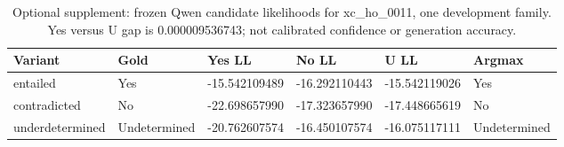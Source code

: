 \begin{table}[t]
\centering\small
\caption{Optional supplement: frozen Qwen candidate likelihoods for xc\_ho\_0011, one development family. Yes versus U gap is 0.000009536743; not calibrated confidence or generation accuracy.}
\label{tab:s1_qwen_candidate_scores}
\begin{tabularx}{\linewidth}{lXXXXX}
\toprule
Variant & Gold & Yes LL & No LL & U LL & Argmax \\ \midrule
entailed & Yes & -15.542109489 & -16.292110443 & -15.542119026 & Yes \\
contradicted & No & -22.698657990 & -17.323657990 & -17.448665619 & No \\
underdetermined & Undetermined & -20.762607574 & -16.450107574 & -16.075117111 & Undetermined \\
\bottomrule
\end{tabularx}
\end{table}
